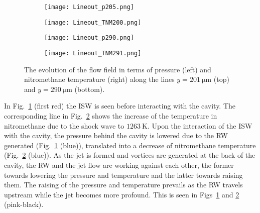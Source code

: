 \documentclass[3p,times,twocolumn]{elsarticle}
\begin{document}
\begin{figure*}[!t]
\begin{minipage}{2\columnwidth}
 \centering
 \begin{subfigure}[b]{0.49\textwidth}
\texttt{[image: Lineout\_p205.png]}     
\caption{}
\label{lineout200p}
\end{subfigure}
 \begin{subfigure}[b]{0.49\textwidth}
\texttt{[image: Lineout\_TNM200.png]}     
\caption{}
\label{lineout200T}
\end{subfigure}
\end{minipage}
\begin{minipage}{2\columnwidth}
    \centering
 \begin{subfigure}[b]{0.49\textwidth}
\texttt{[image: Lineout\_p290.png]}    
\caption{}
\label{lineout290p}
\end{subfigure}
 \begin{subfigure}[b]{0.49\textwidth}
\texttt{[image: Lineout\_TNM291.png]}     
\caption{}
\label{lineout290T}
\end{subfigure}
\end{minipage}
\caption{The evolution of the flow field in terms of pressure (left) and nitromethane temperature (right) along the lines   $y=\SI{201}{\micro \meter}$ (top) and   $y=\SI{290}{\micro \meter}$ (bottom).}
\label{lineouts}
\end{figure*}


In Fig.\ \ref{lineout200p} (first red) the ISW is seen before interacting with the cavity. The corresponding line in Fig.\ \ref{lineout200T} shows the increase of the temperature in nitromethane due to the shock wave to $\SI{1263}{\kelvin}$. Upon the interaction of the ISW with the cavity, the pressure behind the cavity is lowered due to the RW generated (Fig.\ \ref{lineout200p} (blue)), translated into a decrease of nitromethane temperature (Fig.\ \ref{lineout200T} (blue)). As the jet is formed and vortices are generated at the back of the cavity, the RW and the jet flow are working against each other, the former towards lowering the pressure and temperature and the latter towards raising them. The raising of the pressure and temperature prevails as the RW travels upstream while the jet becomes more profound. This is seen in Figs\ \ref{lineout200p} and \ref{lineout200T} (pink-black). 
\end{document}
